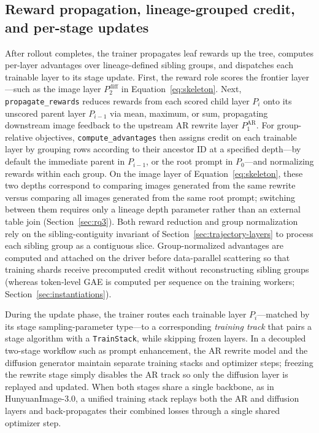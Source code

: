 \documentclass[10pt]{article}
\begin{document}
\subsection{Reward propagation, lineage-grouped credit, and per-stage updates}
\label{sec:fold}

After rollout completes, the trainer propagates leaf rewards up the tree, computes per-layer advantages over lineage-defined sibling groups, and dispatches each trainable layer to its stage update.
First, the reward role scores the frontier layer---such as the image layer $P_2^{\mathrm{diff}}$ in Equation~\ref{eq:skeleton}.
Next, \texttt{propagate\_rewards} reduces rewards from each scored child layer $P_i$ onto its unscored parent layer $P_{i-1}$ via mean, maximum, or sum, propagating downstream image feedback to the upstream AR rewrite layer $P_1^{\mathrm{AR}}$.
For group-relative objectives, \texttt{compute\_advantages} then assigns credit on each trainable layer by grouping rows according to their ancestor ID at a specified depth---by default the immediate parent in $P_{i-1}$, or the root prompt in $P_0$---and normalizing rewards within each group.
On the image layer of Equation~\ref{eq:skeleton}, these two depths correspond to comparing images generated from the same rewrite versus comparing all images generated from the same root prompt; switching between them requires only a lineage depth parameter rather than an external table join (Section~\ref{sec:rq3}).
Both reward reduction and group normalization rely on the sibling-contiguity invariant of Section~\ref{sec:trajectory-layers} to process each sibling group as a contiguous slice.
Group-normalized advantages are computed and attached on the driver before data-parallel scattering so that training shards receive precomputed credit without reconstructing sibling groups (whereas token-level GAE is computed per sequence on the training workers; Section~\ref{sec:instantiations}).

During the update phase, the trainer routes each trainable layer $P_i$---matched by its stage sampling-parameter type---to a corresponding \emph{training track} that pairs a stage algorithm with a \texttt{TrainStack}, while skipping frozen layers.
In a decoupled two-stage workflow such as prompt enhancement, the AR rewrite model and the diffusion generator maintain separate training stacks and optimizer steps; freezing the rewrite stage simply disables the AR track so only the diffusion layer is replayed and updated.
When both stages share a single backbone, as in HunyuanImage-3.0, a unified training stack replays both the AR and diffusion layers and back-propagates their combined losses through a single shared optimizer step.
\end{document}
